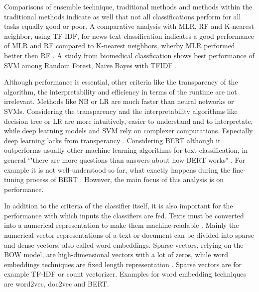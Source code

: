 \documentclass[12pt, a4paper, titlepage]{article}
\begin{document}
Comparisons of ensemble technique, traditional methods and methods within the traditional methods indicate as well that not all classifications perform for all tasks equally good or poor. A comparative analysis with \ac{MLR}, \ac{RF} and K-nearest neighbor, using \ac{TF-IDF}, for news text classification indicates a good performance of \ac{MLR} and \ac{RF} compared to K-nearest neighbors, wherby \ac{MLR} performed better then \ac{RF} \citep{shah2020}. A study from biomedical classfication shows best performance of SVM among Random Forest, Naive Bayes with TFIDF \citep{danso2014}. 

Although performance is essential, other criteria like the transparency of the algorithm, the interpretability and efficiency in terms of the runtime are not irrelevant. Methods like \ac{NB} or \ac{LR} are much faster than neural networks or \ac{SVM}s. Considering the transparency and the interpretability algorithms like decision tree or \ac{LR} are more intuitively, easier to understand and to interpretate, while deep learning models and \ac{SVM} rely on complexer computations. Especially deep learning lacks from transperancy \citep{maglogiannis2007}. Considering \ac{BERT} although it outperforms usually other machine learning algorithms for text classification, in general `"there are more questions than answers about how BERT works" \citep[853]{rogers2020}. For example it is not well-understood so far, what exactly happens during the fine-tuning process of \ac{BERT} \citep{merchant2020}. However, the main focus of this analysis is on performance. 

In addition to the criteria of the classifier itself, it is also important for the performance with which inputs the classifiers are fed. Texts must be converted into a numerical representation to make them machine-readable \citep{singh2019}. Mainly the numerical vector representations of a text or document can be divided into sparse and dense vectors, also called word embeddings. Sparse vectors, relying on the \ac{BOW} model, are high-dimensional vectors with a lot of zeros, while word embeddings techniques are fixed length representation \citep{almeida2019}. Sparse vectors are for example \ac{TF-IDF} or count vectorizer. Examples for word embedding techniques are word2vec, doc2vec and \ac{BERT}. 
\end{document}

